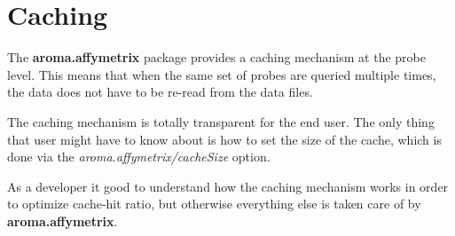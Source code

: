 \documentclass[12pt,a4paper]{article}
\newcommand{\package}[1]{\textbf{#1}\xspace}
\newcommand{\option}[1]{\textsl{#1}\xspace}
\begin{document}
\section{Caching}
The \package{aroma.affymetrix} package provides a caching mechanism at the probe level.  This means that when the same set of probes are queried multiple times, the data does not have to be re-read from the data files.

The caching mechanism is totally transparent for the end user.  The only thing that user might have to know about is how to set the size of the cache, which is done via the \option{aroma.affymetrix/cacheSize} option.

As a developer it good to understand how the caching mechanism works in order to optimize cache-hit ratio, but otherwise everything else is taken care of by \package{aroma.affymetrix}.
\end{document}
